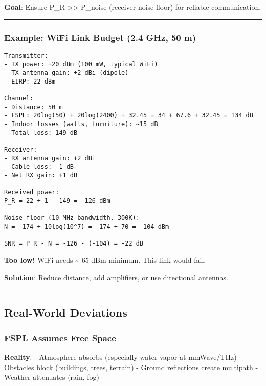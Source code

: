 \textbf{Goal}: Ensure P\_R \textgreater\textgreater{} P\_noise (receiver
noise floor) for reliable communication.

\begin{center}\rule{0.5\linewidth}{0.5pt}\end{center}

\subsubsection{Example: WiFi Link Budget (2.4 GHz, 50
m)}\label{example-wifi-link-budget-2.4-ghz-50-m}

\begin{verbatim}
Transmitter:
- TX power: +20 dBm (100 mW, typical WiFi)
- TX antenna gain: +2 dBi (dipole)
- EIRP: 22 dBm

Channel:
- Distance: 50 m
- FSPL: 20log(50) + 20log(2400) + 32.45 = 34 + 67.6 + 32.45 = 134 dB
- Indoor losses (walls, furniture): ~15 dB
- Total loss: 149 dB

Receiver:
- RX antenna gain: +2 dBi
- Cable loss: -1 dB
- Net RX gain: +1 dB

Received power:
P_R = 22 + 1 - 149 = -126 dBm

Noise floor (10 MHz bandwidth, 300K):
N = -174 + 10log(10^7) = -174 + 70 = -104 dBm

SNR = P_R - N = -126 - (-104) = -22 dB
\end{verbatim}

\textbf{Too low!} WiFi needs \textasciitilde-65 dBm minimum. This link
would fail.

\textbf{Solution}: Reduce distance, add amplifiers, or use directional
antennas.

\begin{center}\rule{0.5\linewidth}{0.5pt}\end{center}

\subsection{\texorpdfstring{ Real-World
Deviations}{ Real-World Deviations}}\label{real-world-deviations}

\subsubsection{FSPL Assumes Free Space}\label{fspl-assumes-free-space}

\textbf{Reality}: - Atmosphere absorbs (especially water vapor at
mmWave/THz) - Obstacles block (buildings, trees, terrain) - Ground
reflections create multipath - Weather attenuates (rain, fog)

